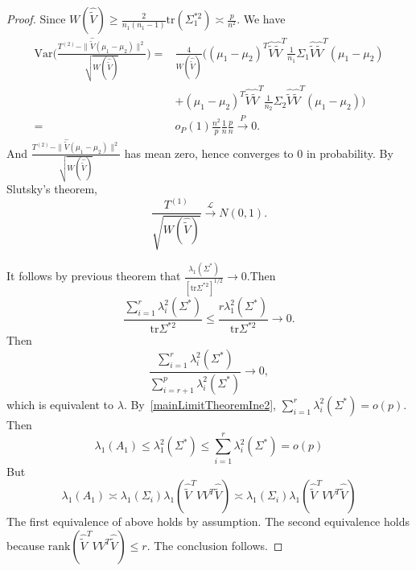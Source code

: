 \begin{proof}
Since $W(\hat{\tilde{V}})\geq \frac{2}{n_1(n_1-1)}\mathrm{tr}(\Sigma_1^{*2})\asymp\frac{p}{n^2}$. 
We have
\begin{equation*}
    \begin{aligned}
    \mathrm{Var}\Big(\frac{T^{(2)}-\|\hat{\tilde{V}}(\mu_1-\mu_2)\|^2}{\sqrt{W(\hat{\tilde{V}})}}\Big)
        =&
        \frac{4}{W(\hat{\tilde{V}})}\Big(
        {(\mu_1-\mu_2)}^T\hat{\tilde{V}}\hat{\tilde{V}}^T       \frac{1}{n_1}\Sigma_1\hat{\tilde{V}}\hat{\tilde{V}}^T(\mu_1-\mu_2)\\
        &+
        {(\mu_1-\mu_2)}^T\hat{\tilde{V}}\hat{\tilde{V}}^T       \frac{1}{n_2}\Sigma_2\hat{\tilde{V}}\hat{\tilde{V}}^T(\mu_1-\mu_2)
        \Big)\\
        =&o_P(1)\frac{n^2}{p}\frac{1}{n}\frac{p}{n}\xrightarrow{P}0.
    \end{aligned}
\end{equation*}
And $\frac{T^{(2)}-\|\hat{\tilde{V}}(\mu_1-\mu_2)\|^2}{\sqrt{W(\hat{\tilde{V}})}}$ has mean zero, hence converges to $0$ in probability. By Slutsky's theorem, 
\begin{equation}
    \frac{T^{(1)}}
        {\sqrt{W(\hat{\tilde{V}})}}
        \xrightarrow{\mathcal{L}} N(0,1).
\end{equation}

It follows by previous theorem that
$\frac{\lambda_1(\Sigma^*)}{{[\mathrm{tr}\Sigma^{*2}]}^{1/2}}\to 0$.Then
\begin{equation}
    \frac{\sum_{i=1}^{r}\lambda_i^2(\Sigma^*)}{\mathrm{tr}\Sigma^{*2}}\leq \frac{r\lambda_1^2(\Sigma^*)}{\mathrm{tr}\Sigma^{*2}}\to 0.
\end{equation} 
    Then
\begin{equation}
    \frac{\sum_{i=1}^{r}\lambda_i^2(\Sigma^*)}{\sum_{i=r+1}^{p}\lambda_i^2(\Sigma^*)}\to 0,
\end{equation} 
which is equivalent to $\lambda$.
By~\eqref{mainLimitTheoremIne2}, $\sum_{i=1}^{r}\lambda_i^2(\Sigma^*)=o(p)$. Then
\begin{equation}
    \lambda_1(A_1)\leq \lambda_1^2(\Sigma^*)\leq \sum_{i=1}^{r}\lambda_i^2(\Sigma^*)=o(p)
\end{equation}
But
\begin{equation}
    \lambda_1(A_1)\asymp
    \lambda_1(\Sigma_i)\lambda_1(\hat{\tilde{V}}^T V V^T\hat{\tilde{V}})
    \asymp
    \lambda_1(\Sigma_i)\lambda_1(\hat{\tilde{V}}^T V V^T \hat{\tilde{V}})
\end{equation}
The first equivalence of above holds by assumption. The second equivalence holds because $\mathrm{rank}(\hat{\tilde{V}}^T V V^T \hat{\tilde{V}})\leq r$. The conclusion follows.
\end{proof}

